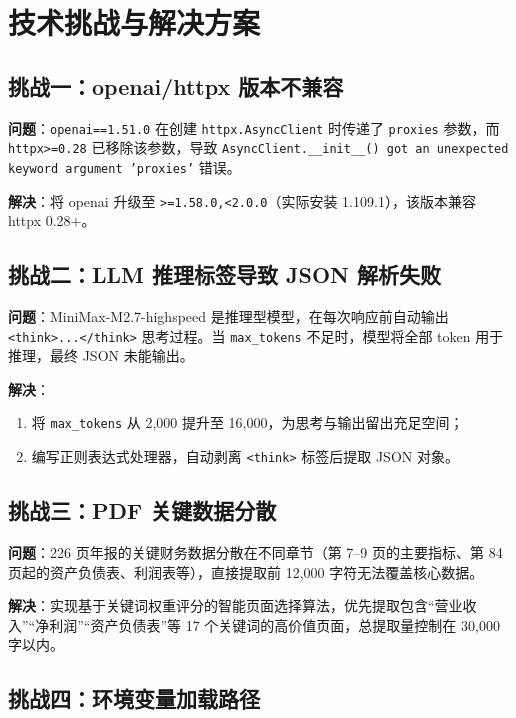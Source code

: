 \documentclass[12pt,a4paper]{article}
\begin{document}
\section{技术挑战与解决方案}

\subsection{挑战一：openai/httpx 版本不兼容}

\textbf{问题}：\texttt{openai==1.51.0} 在创建 \texttt{httpx.AsyncClient} 时传递了 \texttt{proxies} 参数，而 \texttt{httpx>=0.28} 已移除该参数，导致 \texttt{AsyncClient.\_\_init\_\_() got an unexpected keyword argument 'proxies'} 错误。

\textbf{解决}：将 openai 升级至 \texttt{>=1.58.0,<2.0.0}（实际安装 1.109.1），该版本兼容 httpx 0.28+。

\subsection{挑战二：LLM 推理标签导致 JSON 解析失败}

\textbf{问题}：MiniMax-M2.7-highspeed 是推理型模型，在每次响应前自动输出 \texttt{<think>...</think>} 思考过程。当 \texttt{max\_tokens} 不足时，模型将全部 token 用于推理，最终 JSON 未能输出。

\textbf{解决}：
\begin{enumerate}[leftmargin=2em]
  \item 将 \texttt{max\_tokens} 从 2,000 提升至 16,000，为思考与输出留出充足空间；
  \item 编写正则表达式处理器，自动剥离 \texttt{<think>} 标签后提取 JSON 对象。
\end{enumerate}

\subsection{挑战三：PDF 关键数据分散}

\textbf{问题}：226 页年报的关键财务数据分散在不同章节（第 7--9 页的主要指标、第 84 页起的资产负债表、利润表等），直接提取前 12,000 字符无法覆盖核心数据。

\textbf{解决}：实现基于关键词权重评分的智能页面选择算法，优先提取包含``营业收入''``净利润''``资产负债表''等 17 个关键词的高价值页面，总提取量控制在 30,000 字以内。

\subsection{挑战四：环境变量加载路径}
\end{document}
